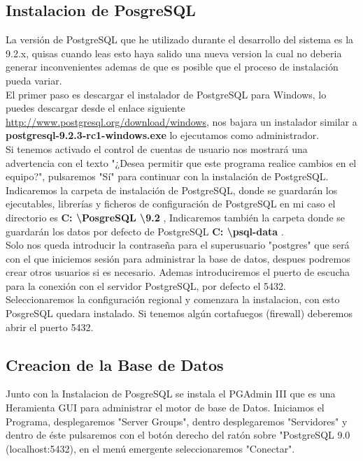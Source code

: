 \subsection{Instalacion de PosgreSQL}

La versión de PostgreSQL que he utilizado durante el desarrollo del sistema es
la 9.2.x, quisas cuando leas esto haya salido una nueva version la cual no deberia
generar inconvenientes ademas de que es posible que el proceso de instalación
pueda variar.\\[0.2cm]
 
El primer paso es descargar el instalador de PostgreSQL para Windows,
lo puedes descargar desde el enlace siguiente
\url{http://www.postgresql.org/download/windows}, nos bajara un instalador similar
a {\bfseries postgresql-9.2.3-rc1-windows.exe} lo ejecutamos como administrador.\\[0.2cm]

Si tenemos activado el control de cuentas de usuario nos mostrará una advertencia
con el texto "¿Desea permitir que este programa realice cambios en el equipo?",
pulsaremos "Sí" para continuar con la instalación de PostgreSQL.\\[0.2cm]

Indicaremos la carpeta de instalación de PostgreSQL, donde se guardarán los
ejecutables, librerías y ficheros de configuración de PostgreSQL en mi caso el
directorio es {\bfseries C: \textbackslash PosgreSQL \textbackslash 9.2 },
Indicaremos también la carpeta donde se guardarán los datos por defecto
de PostgreSQL {\bfseries C: \textbackslash psql-data }.\\[0.2cm]

Solo nos queda introducir la contraseña para el superusuario "postgres" que
será con el que iniciemos sesión para administrar la base de datos, despues
podremos crear otros usuarios si es necesario. Ademas introduciremos el puerto
de escucha para la conexión con el servidor PostgreSQL, por defecto el 5432.\\[0.2cm]

Seleccionaremos la configuración regional y comenzara la instalacion, con esto
PosgreSQL quedara instalado. Si tenemos algún cortafuegos (firewall) deberemos
abrir el puerto 5432.

\subsection{Creacion de la Base de Datos}

Junto con la Instalacion de PosgreSQL se instala el PGAdmin III que es una Heramienta
GUI para administrar el motor de base de Datos. Iniciamos el Programa,
desplegaremos "Server Groups", dentro desplegaremos "Servidores" y dentro de
éste pulsaremos con el botón derecho del ratón sobre "PostgreSQL 9.0 (localhost:5432),
en el menú emergente seleccionaremos "Conectar".

